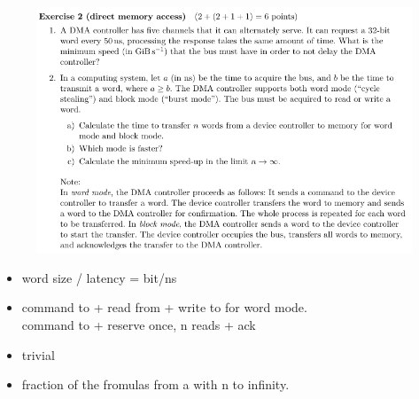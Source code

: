 \documentclass[10pt]{beamer}
\begin{document}
\begin{frame}{}
            \begin{figure}
                \includegraphics[keepaspectratio, width=\textwidth, height=\textheight-2\baselineskip-2\baselineskip]{img/ex9_101.png} \\
            \end{figure}
            \framebreak
            \begin{itemize}
                \item  word size / latency = bit/ns
                \item command to + read from + write to for word mode. \\
                    command to + reserve once, n reads + ack
                \item trivial
                \item fraction of the fromulas from a with n to infinity.
            \end{itemize}
            \framebreak


\end{frame}
\end{document}
